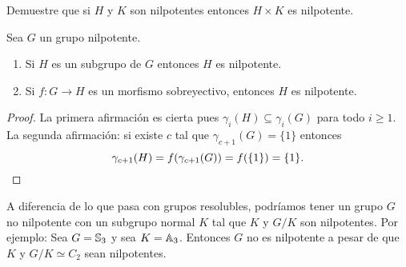 
\begin{exercise}
	\label{exercise:HxK_nilpotente}
	Demuestre que si $H$ y $K$ son nilpotentes entonces $H\times K$ es
	nilpotente.
\end{exercise}


\begin{theorem}
	\label{theorem:nilpotente}
	Sea $G$ un grupo nilpotente.
	\begin{enumerate}
		\item Si $H$ es un subgrupo de $G$ entonces $H$ es nilpotente.
		\item Si $f\colon G\to H$ es un morfismo sobreyectivo, entonces $H$ es
			nilpotente. 
	\end{enumerate}
\end{theorem}

\begin{proof}
	La primera afirmación es cierta pues $\gamma_i(H)\subseteq\gamma_i(G)$ para
	todo $i\geq1$. La segunda afirmación: si existe $c$ tal que $\gamma_{c+1}(G)=\{1\}$
	entonces \[
	\gamma_{c+1}(H)=f(\gamma_{c+1}(G))=f(\{1\})=\{1\}.\qedhere
	\]
\end{proof}

\begin{example}
	A diferencia de lo que pasa con grupos resolubles, podríamos tener un grupo
	$G$ no nilpotente con un subgrupo normal $K$ tal que $K$ y $G/K$ son
	nilpotentes. Por ejemplo: Sea $G=\mathbb{S}_3$ y sea $K=\mathbb{A}_3$. Entonces $G$ no
	es nilpotente a pesar de que $K$ y $G/K\simeq C_2$ sean nilpotentes.
\end{example}


